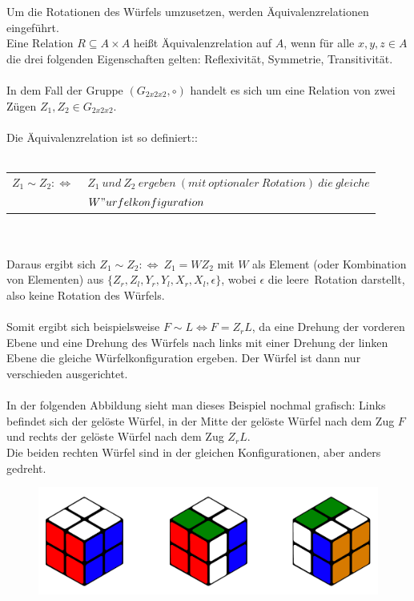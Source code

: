 \documentclass[12pt,a4paper, usenames, dvipsnames]{article}
\begin{document}
Um die Rotationen des Würfels umzusetzen, werden Äquivalenzrelationen eingeführt. \\
Eine Relation $R \subseteq A \times A$ heißt Äquivalenzrelation auf $A$, wenn für alle $x, y, z \in A$ die drei folgenden Eigenschaften gelten: Reflexivität, Symmetrie, Transitivität. \cite{Buch} \\
\\
In dem Fall der Gruppe $(G_{2x2x2}, \circ)$ handelt es sich um eine Relation von zwei Zügen $Z_1, Z_2 \in G_{2x2x2}$. \\ 
\\
Die Äquivalenzrelation ist so definiert:: \\  \\
\begin{tabular}{l l}
$Z_1 \sim Z_2 :\Leftrightarrow \ $  & $Z_1 \ und \ Z_2 \ ergeben \ (mit \ optionaler \ Rotation) \ die \ gleiche $\\
\  & $W"urfelkonfiguration$ \\
\end{tabular}
\\
\\
Daraus ergibt sich $Z_1 \sim Z_2 :\Leftrightarrow \ Z_1 = WZ_2$ mit $W$ als Element (oder Kombination von Elementen) aus $\{{Z_r}, {Z_l}, {Y_r}, {Y_l}, {X_r}, {X_l}, \epsilon\}$, wobei $\epsilon$ die \glqq leere\grqq \ Rotation darstellt, also keine Rotation des Würfels. \\
\\ 
Somit ergibt sich beispielsweise $F \sim L \Leftrightarrow F = Z_rL$, da eine Drehung der vorderen Ebene und eine Drehung des Würfels nach links mit einer Drehung der linken Ebene die gleiche Würfelkonfiguration ergeben. Der Würfel ist dann nur verschieden ausgerichtet. \\
\\
In der folgenden Abbildung sieht man dieses Beispiel nochmal grafisch: Links befindet sich der gelöste Würfel, in der Mitte der gelöste Würfel nach dem Zug $F$ und rechts der gelöste Würfel nach dem Zug $Z_rL$. \\
Die beiden rechten Würfel sind in der gleichen Konfigurationen, aber anders gedreht.
\begin{figure}[H]
\includegraphics[scale=0.15]{3_wuerfel.png}
\caption[Würfel gelöst, nach Zug $F$ und nach $Z_rL$]{}
\end{figure}
\end{document}
